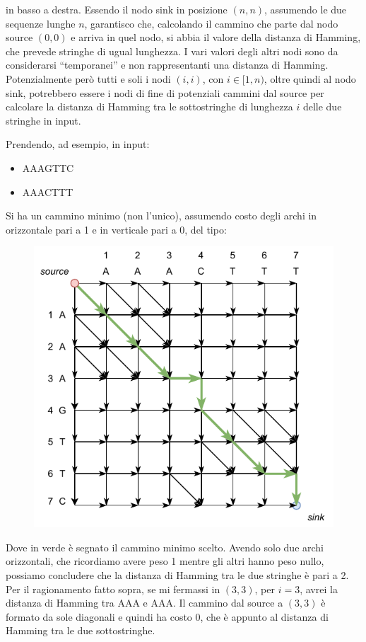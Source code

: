 \documentclass[a4paper,12pt, oneside]{book}
\begin{document}
in basso a destra. Essendo il nodo sink in posizione $(n,n)$, assumendo le due 
sequenze lunghe $n$, garantisco che, calcolando il cammino che parte dal nodo
source $(0,0)$ e arriva in quel nodo, si abbia il valore della
distanza di Hamming, che prevede stringhe di ugual lunghezza. I vari valori
degli altri nodi sono da considerarsi ``temporanei'' e non rappresentanti una
distanza di Hamming. Potenzialmente però tutti e soli i nodi $(i,i)$, con
$i\in[1,n)$, oltre quindi al nodo sink, potrebbero essere i nodi di fine di
potenziali cammini dal source per calcolare la distanza di Hamming tra le
sottostringhe di lunghezza $i$ delle due stringhe in input.\\
\begin{esempio}
  Prendendo, ad esempio, in input:
  \begin{itemize}
    \item AAAGTTC
    \item AAACTTT
  \end{itemize}
  Si ha un cammino minimo (non l'unico), assumendo costo degli archi in
  orizzontale pari a 1 e in verticale pari a 0, del tipo:
  \begin{figure}[H]
    \centering
    \includegraphics[scale = 0.9]{img/es3.pdf}
  \end{figure}
  \noindent
  Dove in verde è segnato il cammino minimo scelto. Avendo solo due archi
  orizzontali, che ricordiamo avere peso 1 mentre gli altri hanno peso nullo,
  possiamo concludere che la distanza di Hamming tra le due stringhe è 
  pari a 2.\\
  Per il ragionamento fatto sopra, se mi fermassi in $(3,3)$, per $i=3$, avrei
  la distanza di Hamming tra AAA e AAA. Il cammino dal source a $(3,3)$ è
  formato da sole diagonali e quindi ha costo 0, che è appunto al distanza di
  Hamming tra le due sottostringhe.
\end{esempio}
\end{document}
